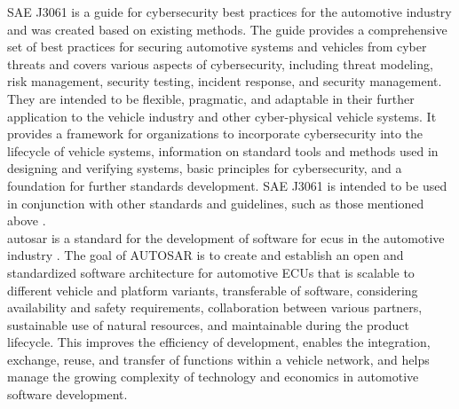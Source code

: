 SAE J3061 is a guide for cybersecurity best practices for the automotive industry and was created based on existing methods. 
The guide provides a comprehensive set of best practices for securing automotive systems and vehicles from cyber threats and covers various aspects of cybersecurity, including threat modeling, risk management, security testing, incident response, and security management.
They are intended to be flexible, pragmatic, and adaptable in their further application to the vehicle industry and other cyber-physical vehicle systems. 
It provides a framework for organizations to incorporate cybersecurity into the lifecycle of vehicle systems, information on standard tools and methods used in designing and verifying systems, basic principles for cybersecurity, and a foundation for further standards development. 
SAE J3061 is intended to be used in conjunction with other standards and guidelines, such as those mentioned above \cite{sae_j3061}.\\

\gls{autosar} is a standard for the development of software for \gls{ecu}s in the automotive industry \cite{autosar}.
The goal of AUTOSAR is to create and establish an open and standardized software architecture for automotive ECUs that is scalable to different vehicle and platform variants, 
transferable of software, considering availability and safety requirements, collaboration between various partners, sustainable use of natural resources, 
and maintainable during the product lifecycle. 
This improves the efficiency of development, enables the integration, exchange, reuse, and transfer of functions within a vehicle network, 
and helps manage the growing complexity of technology and economics in automotive software development.\\

